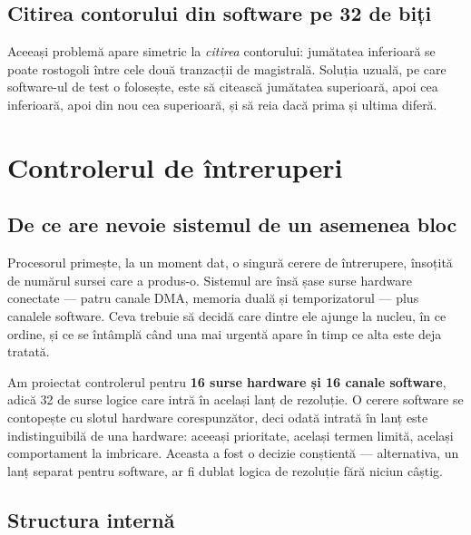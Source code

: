 \documentclass[11pt,openany]{report}
\begin{document}
\section{Citirea contorului din software pe 32 de biți}

Aceeași problemă apare simetric la \emph{citirea} contorului: jumătatea
inferioară se poate rostogoli între cele două tranzacții de magistrală. Soluția
uzuală, pe care software-ul de test o folosește, este să citească jumătatea
superioară, apoi cea inferioară, apoi din nou cea superioară, și să reia dacă
prima și ultima diferă.

\chapter{Controlerul de întreruperi}
\label{ch:pic}

\section{De ce are nevoie sistemul de un asemenea bloc}

Procesorul primește, la un moment dat, o singură cerere de întrerupere, însoțită de numărul
sursei care a produs-o. Sistemul are însă șase surse hardware conectate --- patru
canale DMA, memoria duală și temporizatorul --- plus canalele software. Ceva
trebuie să decidă care dintre ele ajunge la nucleu, în ce ordine, și ce se
întâmplă când una mai urgentă apare în timp ce alta este deja tratată.

Am proiectat controlerul pentru \textbf{16 surse hardware și 16 canale
software}, adică 32 de surse logice care intră în același lanț de rezoluție. O
cerere software se contopește cu slotul hardware corespunzător, deci odată
intrată în lanț este indistinguibilă de una hardware: aceeași prioritate, același
termen limită, același comportament la imbricare. Aceasta a fost o decizie
conștientă --- alternativa, un lanț separat pentru software, ar fi dublat logica
de rezoluție fără niciun câștig.

\section{Structura internă}
\end{document}
